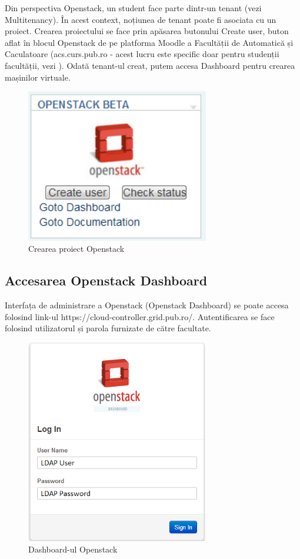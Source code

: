 Din perspectiva Openstack, un student face parte dintr-un tenant (vezi
Multitenancy). În acest context, noțiunea de tenant poate fi asociata cu un
proiect. Crearea proiectului se face prin apăsarea butonului Create user, buton
aflat în blocul Openstack de pe platforma Moodle a Facultății de Automatică și
Caculatoare (acs.curs.pub.ro - acest lucru este specific doar pentru studenții
facultății, vezi ). Odată
tenant-ul creat, putem accesa Dashboard pentru crearea mașinilor virtuale.

\begin{figure}[!htbp]
	\centering
	\includegraphics[width=8cm]{chapters/14-vm/img/openstack-project-img.png}
	\caption{Crearea proiect Openstack}
	\label{fig:vm-openstack-project}
\end{figure}

\subsection{Accesarea Openstack Dashboard}
\label{sec:vm-openstack-dashboard}

Interfața de administrare a Openstack (Openstack Dashboard) se poate accesa
folosind link-ul https://cloud-controller.grid.pub.ro/. Autentificarea se face
folosind utilizatorul și parola furnizate de către facultate.

\begin{figure}[!htbp]
	\centering
	\includegraphics[width=8cm]{chapters/14-vm/img/openstack-dashboard-img.png}
	\caption{Dashboard-ul Openstack}
	\label{fig:vm-openstack-dashboard}
\end{figure}


